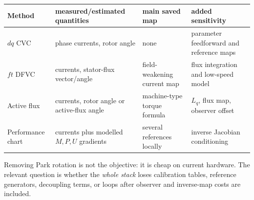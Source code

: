 \begin{center}
\begin{tabularx}{\textwidth}{lXXX}
\toprule
Method & measured/estimated quantities & main saved map & added sensitivity\\
\midrule
\(dq\) CVC & phase currents, rotor angle & none & parameter feedforward and reference maps\\
\(ft\) DFVC & currents, stator-flux vector/angle & field-weakening current map & flux integration and low-speed model\\
Active flux & currents, rotor angle or active-flux angle & machine-type torque formula & \(L_q\), flux map, observer offset\\
Performance chart & currents plus modelled \(M,P,U\) gradients & several references locally & inverse Jacobian conditioning\\
\bottomrule
\end{tabularx}
\end{center}

Removing Park rotation is not the objective: it is cheap on current hardware.
The relevant question is whether the \emph{whole stack} loses calibration
tables, reference generators, decoupling terms, or loops after observer and
inverse-map costs are included.
